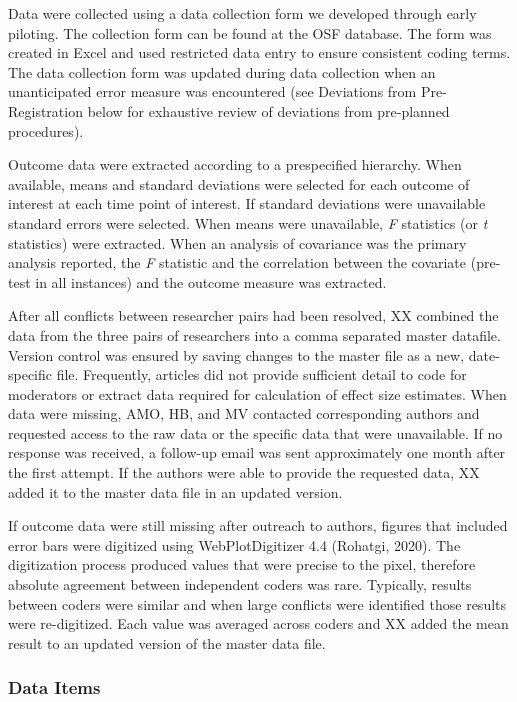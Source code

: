 \documentclass[
  english,
  man,mask,floatsintext]{apa7}
\begin{document}
Data were collected using a data collection form we developed through early piloting. The collection form can be found at the OSF database. The form was created in Excel and used restricted data entry to ensure consistent coding terms. The data collection form was updated during data collection when an unanticipated error measure was encountered (see Deviations from Pre-Registration below for exhaustive review of deviations from pre-planned procedures).

Outcome data were extracted according to a prespecified hierarchy. When available, means and standard deviations were selected for each outcome of interest at each time point of interest. If standard deviations were unavailable standard errors were selected. When means were unavailable, \emph{F} statistics (or \emph{t} statistics) were extracted. When an analysis of covariance was the primary analysis reported, the \emph{F} statistic and the correlation between the covariate (pre-test in all instances) and the outcome measure was extracted.

After all conflicts between researcher pairs had been resolved, XX combined the data from the three pairs of researchers into a comma separated master datafile. Version control was ensured by saving changes to the master file as a new, date-specific file. Frequently, articles did not provide sufficient detail to code for moderators or extract data required for calculation of effect size estimates. When data were missing, AMO, HB, and MV contacted corresponding authors and requested access to the raw data or the specific data that were unavailable. If no response was received, a follow-up email was sent approximately one month after the first attempt. If the authors were able to provide the requested data, XX added it to the master data file in an updated version.

If outcome data were still missing after outreach to authors, figures that included error bars were digitized using WebPlotDigitizer 4.4 (Rohatgi, 2020). The digitization process produced values that were precise to the pixel, therefore absolute agreement between independent coders was rare. Typically, results between coders were similar and when large conflicts were identified those results were re-digitized. Each value was averaged across coders and XX added the mean result to an updated version of the master data file.

\hypertarget{data-items}{%
\subsubsection{Data Items}\label{data-items}}
\end{document}
